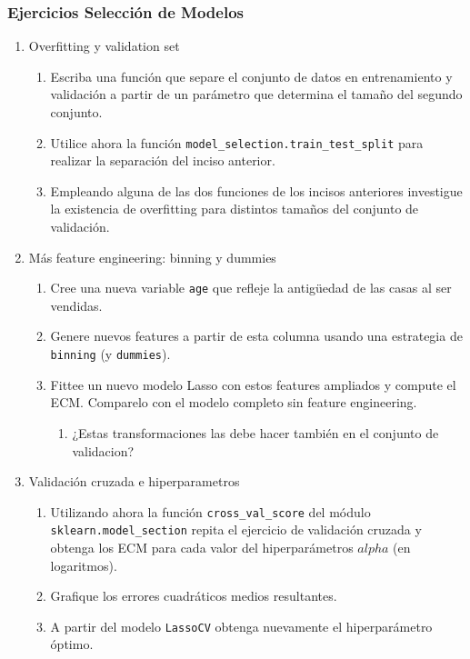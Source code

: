 \documentclass[leqno, 10pt, envcountsect]{beamer}
\numberwithin{equation}{section}
\theoremstyle{definition}
\theoremstyle{example}
\numberwithin{figure}{section}
\numberwithin{table}{section}
\let\olditem\item
\renewcommand{\item}{%
\olditem\vspace{1pt}}
\begin{document}
\begin{frame}
  \frametitle{Ejercicios Selección de Modelos}
  \begin{enumerate}
    \item Overfitting y validation set
      \begin{enumerate}
        \item Escriba una función que separe el conjunto de datos en
          entrenamiento y validación a partir de un parámetro que determina el
          tamaño del segundo conjunto.
        \item Utilice ahora la función
          \texttt{model_selection.train_test_split} para realizar la
          separación del inciso anterior.
        \item Empleando alguna de las dos funciones de los incisos anteriores
          investigue la existencia de overfitting para distintos tamaños del
          conjunto de validación.
      \end{enumerate}
    \item Más feature engineering: binning y dummies
      \begin{enumerate}
        \item Cree una nueva variable \texttt{age} que refleje la antigüedad
          de las casas al ser vendidas.
        \item Genere nuevos features a partir de esta columna usando una
        estrategia de \texttt{binning} (y \texttt{dummies}).
        \item Fittee un nuevo modelo Lasso con estos features ampliados y
          compute el ECM. Comparelo con el modelo completo sin feature
          engineering.
          \begin{enumerate}
            \item ¿Estas transformaciones las debe hacer también en el conjunto de validacion?
          \end{enumerate}
      \end{enumerate}
    \item Validación cruzada e hiperparametros
      \begin{enumerate}
        \item Utilizando ahora la función \texttt{cross_val_score} del módulo
          \texttt{sklearn.model_section} repita el ejercicio de validación
          cruzada y obtenga los ECM para cada valor del hiperparámetros $alpha$ (en logaritmos).
        \item Grafique los errores cuadráticos medios resultantes.
        \item A partir del modelo \texttt{LassoCV} obtenga nuevamente el
          hiperparámetro óptimo.
      \end{enumerate}
  \end{enumerate}
\end{frame}
\end{document}
